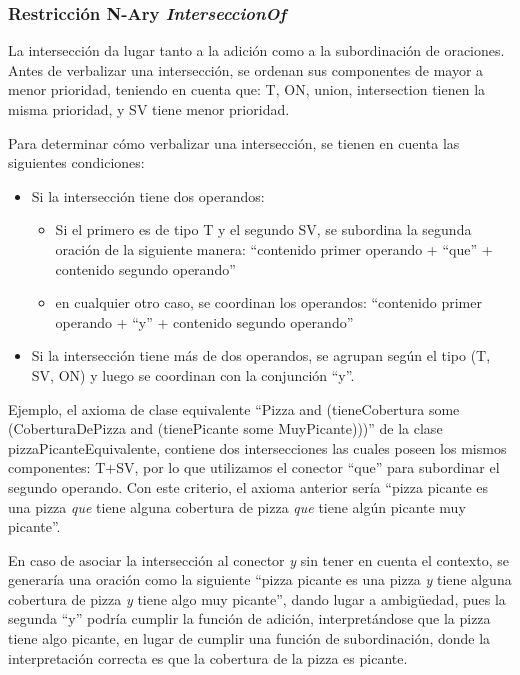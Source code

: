 \subsubsection{Restricción N-Ary \emph{InterseccionOf}}
La intersección da lugar tanto a la adición como a la subordinación de oraciones. Antes de verbalizar una intersección, se ordenan sus componentes de mayor a menor prioridad, teniendo en cuenta que: T, ON, union, intersection tienen la misma prioridad, y SV tiene menor prioridad. 

Para determinar cómo verbalizar una intersección, se tienen en cuenta las siguientes condiciones:
\begin{itemize}
    \item Si la intersección tiene dos operandos:
        \begin{itemize}
            \item Si el primero es de tipo T  y el segundo SV, se subordina la segunda oración de la siguiente manera:
            ``contenido primer operando + ``que'' + contenido segundo operando''
            \item en cualquier otro caso, se coordinan los operandos:
            ``contenido primer operando + ``y'' + contenido segundo operando''
        \end{itemize}
        \item Si la intersección tiene más de dos operandos, se agrupan según el tipo  (T, SV, ON) y luego se coordinan con la conjunción ``y''.
\end{itemize}

Ejemplo, el axioma de clase equivalente ``Pizza and (tieneCobertura some (CoberturaDePizza and (tienePicante some MuyPicante)))'' de la clase pizzaPicanteEquivalente, contiene dos intersecciones las cuales poseen los mismos componentes: T$+$SV, por lo que utilizamos el conector ``que'' para subordinar el segundo operando. Con este criterio, el axioma anterior sería ``pizza picante es una pizza \emph{que} tiene alguna cobertura de pizza \emph{que} tiene algún picante muy picante''.

En caso de asociar la intersección al conector \emph{y} sin tener en cuenta el contexto, se generaría una oración como la siguiente ``pizza picante es una pizza \emph{y} tiene alguna cobertura de pizza \emph{y} tiene algo muy picante'', dando lugar a ambigüedad, pues la segunda ``y'' podría cumplir la función de adición, interpretándose que la pizza tiene algo picante, en lugar de cumplir una función de subordinación, donde la interpretación correcta es que la cobertura de la pizza es picante. 


